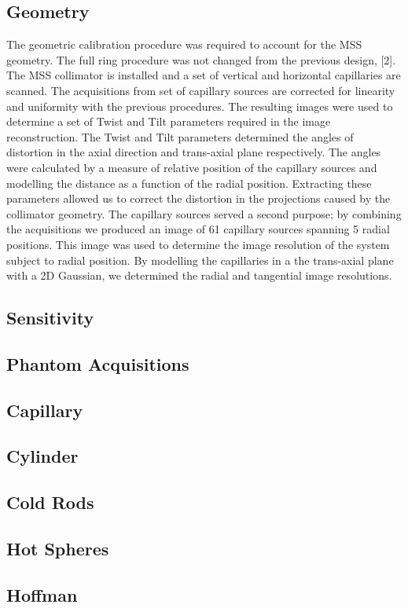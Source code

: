 \subsection{Geometry}
The geometric calibration procedure was required to account
for the MSS geometry. The full ring procedure was not
changed from the previous design, [2]. The MSS collimator
is installed and a set of vertical and horizontal capillaries
are scanned. The acquisitions from set of capillary sources
are corrected for linearity and uniformity with the previous
procedures. The resulting images were used to determine
a set of Twist and Tilt parameters required in the image
reconstruction. The Twist and Tilt parameters determined the
angles of distortion in the axial direction and trans-axial
plane respectively. The angles were calculated by a measure
of relative position of the capillary sources and modelling
the distance as a function of the radial position. Extracting
these parameters allowed us to correct the distortion in the
projections caused by the collimator geometry.
The capillary sources served a second purpose; by combining
the acquisitions we produced an image of 61 capillary
sources spanning 5 radial positions. This image was used to
determine the image resolution of the system subject to radial
position. By modelling the capillaries in a the trans-axial plane
with a 2D Gaussian, we determined the radial and tangential
image resolutions.

\subsection{Sensitivity}
\subsection{Phantom Acquisitions}
\subsection{Capillary}
\subsection{Cylinder}
\subsection{Cold Rods}
\subsection{Hot Spheres} 
\subsection{Hoffman}

